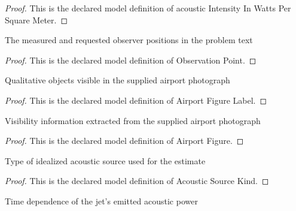 \begin{proof}
  This is the declared model definition of acoustic Intensity In Watts Per Square Meter.
\end{proof}
\begin{definition}
  \label{def:physics:phyx-mini-0212:phyxminiproblems-problemphyxmini0212-observationpoint}
  The measured and requested observer positions in the problem text
\end{definition}
\begin{proof}
  This is the declared model definition of Observation Point.
\end{proof}
\begin{definition}
  \label{def:physics:phyx-mini-0212:phyxminiproblems-problemphyxmini0212-airportfigurelabel}
  Qualitative objects visible in the supplied airport photograph
\end{definition}
\begin{proof}
  This is the declared model definition of Airport Figure Label.
\end{proof}
\begin{definition}
  \label{def:physics:phyx-mini-0212:phyxminiproblems-problemphyxmini0212-airportfigure}
  Visibility information extracted from the supplied airport photograph
\end{definition}
\begin{proof}
  This is the declared model definition of Airport Figure.
\end{proof}
\begin{definition}
  \label{def:physics:phyx-mini-0212:phyxminiproblems-problemphyxmini0212-acousticsourcekind}
  Type of idealized acoustic source used for the estimate
\end{definition}
\begin{proof}
  This is the declared model definition of Acoustic Source Kind.
\end{proof}
\begin{definition}
  \label{def:physics:phyx-mini-0212:phyxminiproblems-problemphyxmini0212-emissionregime}
  Time dependence of the jet's emitted acoustic power
\end{definition}
